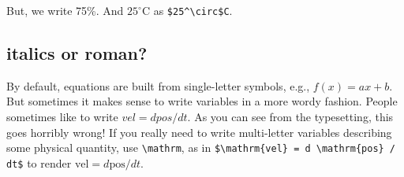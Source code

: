\documentclass{article}
\begin{document}
But, we write 75\%. And $25^\circ$C as \verb+$25^\circ$C+.


\subsection{italics or roman?}
By default, equations are built from single-letter symbols, e.g., $f(x) = ax+b$.  But sometimes it makes
sense to write variables in a more wordy fashion.  People sometimes like to write $vel = d pos / d t$.  As
you can see from the typesetting, this goes horribly wrong!  If you really need to write multi-letter
variables describing some physical quantity, use \verb+\mathrm+, as in
\verb+$\mathrm{vel} = d \mathrm{pos} / dt$+ to render $\mathrm{vel} = d \mathrm{pos} / dt$.
\end{document}
